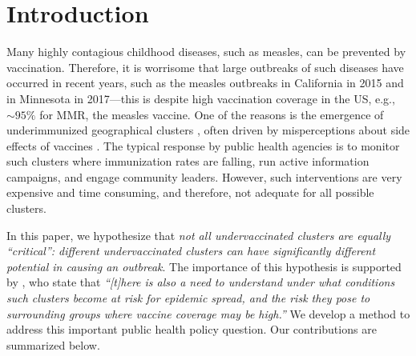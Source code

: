 \section{Introduction}
Many highly contagious childhood diseases, such as measles, can be prevented by
vaccination. Therefore, it is worrisome that large outbreaks of such diseases 
have occurred in recent years, such as the measles
outbreaks in California in 2015 and in Minnesota in 2017---this is
despite high vaccination coverage in the US, e.g., $\sim 95\%$ for MMR, the measles vaccine. 
One of the reasons is the emergence of underimmunized geographical clusters \cite{lieu2015geographic}, often driven by misperceptions about 
side effects of vaccines \cite{atwell:pediatrics13}.  The typical response by public
health agencies is to monitor such clusters where immunization rates are falling, run active information campaigns, and engage community leaders. However, such interventions are very expensive and time consuming, and therefore, not adequate for all possible clusters.

In this paper, we hypothesize that \emph{not all undervaccinated clusters are equally ``critical'': different undervaccinated
clusters can have significantly different potential in causing an
outbreak}. The importance of this hypothesis is supported by \cite{metcalf:epidemics15},
who state that \emph{``[t]here is also a need to understand under what conditions such clusters become at risk for epidemic spread, and the risk they pose to surrounding groups where vaccine coverage may be high.''} We develop a method to address this important public health policy question.
Our contributions are summarized below.






